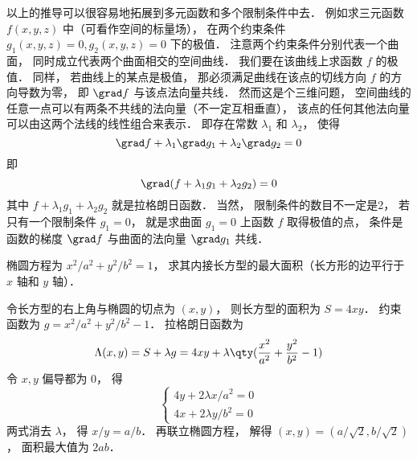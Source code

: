 以上的推导可以很容易地拓展到多元函数和多个限制条件中去． 例如求三元函数 $f(x,y,z)$ 中（可看作空间的标量场）， 在两个约束条件 $g_1(x,y,z) = 0, g_2(x,y,z) = 0$ 下的极值． 注意两个约束条件分别代表一个曲面， 同时成立代表两个曲面相交的空间曲线． 我们要在该曲线上求函数 $f$ 的极值． 同样， 若曲线上的某点是极值， 那必须满足曲线在该点的切线方向 $f$ 的方向导数为零， 即 $\grad f$ 与该点法向量共线． 然而这是个三维问题， 空间曲线的任意一点可以有两条不共线的法向量（不一定互相垂直）， 该点的任何其他法向量可以由这两个法线的线性组合来表示． 即存在常数 $\lambda_1$ 和 $\lambda_2$， 使得
\begin{equation}
\grad f + \lambda_1 \grad g_1 + \lambda_2 \grad g_2 = 0
\end{equation}
即
\begin{equation}
\grad (f + \lambda_1 g_1 + \lambda_2 g_2) = 0
\end{equation}
其中 $f + \lambda_1 g_1 + \lambda_2 g_2$ 就是拉格朗日函数． 当然， 限制条件的数目不一定是2， 若只有一个限制条件 $g_1 = 0$， 就是求曲面 $g_1 = 0$ 上函数 $f$ 取得极值的点， 条件是函数的梯度 $\grad f$ 与曲面的法向量 $\grad g_1$ 共线．

\begin{example}{}
椭圆方程为 $x^2/a^2 + y^2/b^2 = 1$， 求其内接长方型的最大面积（长方形的边平行于 $x$ 轴和 $y$ 轴）．

令长方型的右上角与椭圆的切点为 $(x,y)$， 则长方型的面积为 $S = 4xy$． 约束函数为 $g = x^2/a^2 + y^2/b^2 - 1$． 拉格朗日函数为
\begin{equation}
\Lambda(x,y) = S + \lambda g = 4xy + \lambda \qty(\frac{x^2}{a^2} + \frac{y^2}{b^2} - 1)
\end{equation}
令 $x, y$ 偏导都为 0， 得
\begin{equation}
\begin{cases}
4y + 2\lambda x/a^2 = 0\\
4x + 2\lambda y/b^2 = 0
\end{cases}
\end{equation}
两式消去 $\lambda$， 得 $x/y = a/b$． 再联立椭圆方程， 解得 $(x,y) = (a/\sqrt{2}, b/\sqrt{2})$， 面积最大值为 $2ab$．
\end{example}
